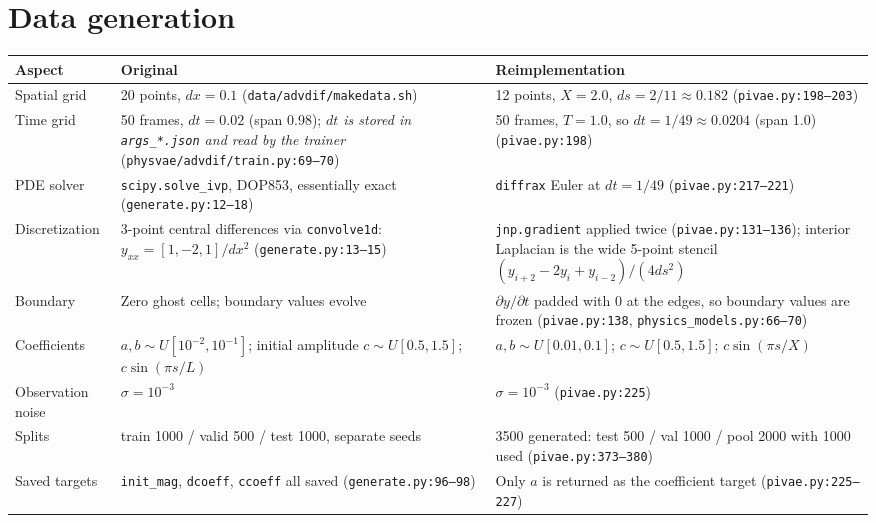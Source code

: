 \documentclass[11pt,a4paper]{article}
\newcommand{\code}[1]{\texttt{#1}}
\begin{document}
\section{Data generation}
\label{sec:data}

\begin{table}[h]
\centering
\small
\begin{tabularx}{\textwidth}{LXX}
\toprule
\textbf{Aspect} & \textbf{Original} & \textbf{Reimplementation} \\
\midrule
Spatial grid & 20 points, $dx = 0.1$ (\code{data/advdif/makedata.sh}) & 12 points, $X = 2.0$, $ds = 2/11 \approx 0.182$ (\code{pivae.py:198--203}) \\
Time grid & 50 frames, $dt = 0.02$ (span 0.98); \emph{$dt$ is stored in \code{args\_*.json} and read by the trainer} (\code{physvae/advdif/train.py:69--70}) & 50 frames, $T = 1.0$, so $dt = 1/49 \approx 0.0204$ (span 1.0) (\code{pivae.py:198}) \\
PDE solver & \code{scipy.solve\_ivp}, DOP853, essentially exact (\code{generate.py:12--18}) & \code{diffrax} Euler at $dt = 1/49$ (\code{pivae.py:217--221}) \\
Discretization & 3-point central differences via \code{convolve1d}: $y_{xx} = [1,-2,1]/dx^2$ (\code{generate.py:13--15}) & \code{jnp.gradient} applied twice (\code{pivae.py:131--136}); interior Laplacian is the wide 5-point stencil $(y_{i+2}-2y_i+y_{i-2})/(4ds^2)$ \\
Boundary & Zero ghost cells; boundary values evolve & $\partial y/\partial t$ padded with 0 at the edges, so boundary values are frozen (\code{pivae.py:138}, \code{physics\_models.py:66--70}) \\
Coefficients & $a, b \sim U[10^{-2}, 10^{-1}]$; initial amplitude $c \sim U[0.5, 1.5]$; $c\sin(\pi s/L)$ & $a, b \sim U[0.01, 0.1]$; $c \sim U[0.5,1.5]$; $c\sin(\pi s/X)$ \\
Observation noise & $\sigma = 10^{-3}$ & $\sigma = 10^{-3}$ (\code{pivae.py:225}) \\
Splits & train 1000 / valid 500 / test 1000, separate seeds & 3500 generated: test 500 / val 1000 / pool 2000 with 1000 used (\code{pivae.py:373--380}) \\
Saved targets & \code{init\_mag}, \code{dcoeff}, \code{ccoeff} all saved (\code{generate.py:96--98}) & Only $a$ is returned as the coefficient target (\code{pivae.py:225--227}) \\
\bottomrule
\end{tabularx}
\end{table}
\end{document}
